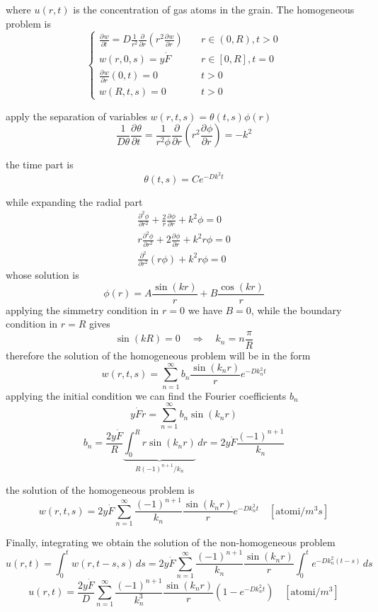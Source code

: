\documentclass{article}
\newcommand{\pderiv}[3][]{\frac{\partial^{#1} #2}{\partial #3^{#1}}}
\begin{document}
where $u(r,t)$ is the concentration of gas atoms in the grain. The homogeneous problem is 
\[
\begin{cases}
  \pderiv{w}{t} = D \frac{1}{r^2}\pderiv{}{r}( r^2 \pderiv{w}{r} )  \quad & r \in (0, R), t > 0 \\
  w(r,0,s) = y\dot{F} \quad & r \in [0, R], t = 0 \\
  \pderiv{w}{r}(0,t) = 0 \quad & t > 0\\
  w(R, t, s) = 0 \quad & t > 0
  \end{cases}
\]

apply the separation of variables $w(r,t,s) = \theta(t,s)\phi(r)$
\[
  \frac{1}{D\theta}\pderiv{\theta}{t} = \frac{1}{r^2\phi}\pderiv{}{r}( r^2 \pderiv{\phi}{r} ) = -k^2
\]

the time part is
\[
  \theta(t,s) = Ce^{-Dk^2t}
\]

while expanding the radial part
\begin{align*}
  \pderiv[2]{\phi}{r} + \frac{2}{r}\pderiv{\phi}{r} + k^2\phi = 0\\
  r\pderiv[2]{\phi}{r} + 2\pderiv{\phi}{r} + k^2r\phi = 0\\
  \pderiv[2]{}{r}(r\phi) + k^2r\phi = 0
\end{align*}
whose solution is
\[
  \phi(r) = A\frac{\sin(kr)}{r} + B\frac{\cos(kr)}{r}
\]
applying the simmetry condition in $r = 0$ we have $B = 0$, while the boundary condition in $r = R$ gives
\[
  \sin(kR) = 0 \quad\Rightarrow\quad k_n = n\frac{\pi}{R}
\]
therefore the solution of the homogeneous problem will be in the form
\[
  w(r,t,s) = \sum_{n=1}^{\infty} b_n \frac{\sin(k_nr)}{r}e^{-Dk_n^2t}
\]
applying the initial condition we can find the Fourier coefficients $b_n$
\[
  y\dot{F}r = \sum_{n=1}^{\infty} b_n \sin(k_nr)
\]
\[
  b_n = \frac{2y\dot{F}}{R}\underbrace{\int_0^R r\sin(k_nr)}_{R(-1)^{n+1} / k_n} \, dr = 2y\dot{F}\frac{(-1)^{n+1}}{k_n}
\]

the solution of the homogeneous problem is
\[
  w(r,t,s) = 2y\dot{F}\sum_{n=1}^{\infty} \frac{(-1)^{n+1}}{k_n}\frac{\sin(k_nr)}{r}e^{-Dk_n^2t} \quad [\text{atomi}/m^3s]
\]

Finally, integrating we obtain the solution of the non-homogeneous problem
\[
  u(r,t) = \int_0^t w(r,t-s,s) \, ds = 2y\dot{F}\sum_{n=1}^{\infty} \frac{(-1)^{n+1}}{k_n}\frac{\sin(k_nr)}{r}\int_0^t e^{-Dk_n^2(t-s)} \, ds
\]
\[
  u(r,t) = \frac{2y\dot{F}}{D}\sum_{n=1}^{\infty} \frac{(-1)^{n+1}}{k_n^3}\frac{\sin(k_nr)}{r}\left(1 - e^{-Dk_n^2t}\right)\quad [\text{atomi}/m^3]
\]
\end{document}

